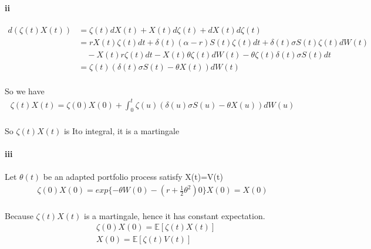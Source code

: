 \documentclass{article}
\begin{document}
\paragraph{ii}
\begin{align*}
  d(\zeta(t)X(t)) & = \zeta(t)dX(t)+X(t)d\zeta(t)+dX(t)d\zeta(t)\\
   & =rX(t) \zeta(t)dt+\delta(t)(\alpha-r)S(t)\zeta(t)dt+\delta(t)\sigma S(t)\zeta (t)dW(t) \\
  &\quad -X(t)r\zeta(t)dt-X(t)\theta\zeta(t)dW(t)-\theta\zeta(t)\delta(t)\sigma S(t)dt\\
  &=\zeta(t)(\delta(t)\sigma S(t)-\theta X(t))dW(t)
\end{align*}
\paragraph{}{So we have }
\begin{align*}
  \zeta(t)X(t) =\zeta(0)X(0)+\int_{0}^{t}\zeta(u)(\delta(u)\sigma S(u)-\theta X(u))dW(u)
\end{align*}
\paragraph{}{So $\zeta(t)X(t)$ is Ito integral, it is a martingale }
\paragraph{iii}
\paragraph{}{Let $\theta(t)$ be an adapted portfolio process satisfy X(t)=V(t)}
\begin{align*}
  \zeta(0)X(0)=exp\{-\theta W(0)-(r+\frac{1}{2}\theta^2)0\}X(0)=X(0)
\end{align*}
\paragraph{}{Because $ \zeta(t)X(t)$ is a martingale, hence it has constant expectation.}
\begin{align*}
  &\zeta(0)X(0) =\mathbb{E}[\zeta(t)X(t)]\\
  &X(0)=\mathbb{E}[\zeta(t)V(t)]
\end{align*}
\end{document}
